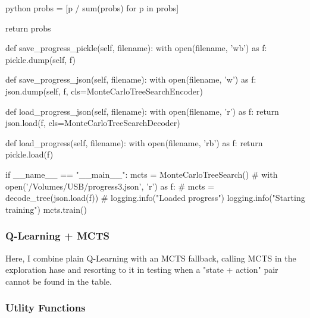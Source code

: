 \begin{mintedbox}{python}
        probs = [p / sum(probs) for p in probs]

        return probs

    def save_progress_pickle(self, filename):
        with open(filename, 'wb') as f:
            pickle.dump(self, f)

    def save_progress_json(self, filename):
        with open(filename, 'w') as f:
            json.dump(self, f, cls=MonteCarloTreeSearchEncoder)

    def load_progress_json(self, filename):
        with open(filename, 'r') as f:
            return json.load(f, cls=MonteCarloTreeSearchDecoder)

    def load_progress(self, filename):
        with open(filename, 'rb') as f:
            return pickle.load(f)


if __name__ == "__main__":
    mcts = MonteCarloTreeSearch()
    # with open('/Volumes/USB/progress3.json', 'r') as f:
    #     mcts = decode_tree(json.load(f))
    #     logging.info("Loaded progress")
    logging.info("Starting training")
    mcts.train()

\end{mintedbox}

\subsubsection{Q-Learning + MCTS}

Here, I combine plain Q-Learning with an MCTS fallback, calling MCTS in the exploration hase and resorting to it in testing when a "state + action" pair cannot be found in the table.

\subsubsection{Utlity Functions}

